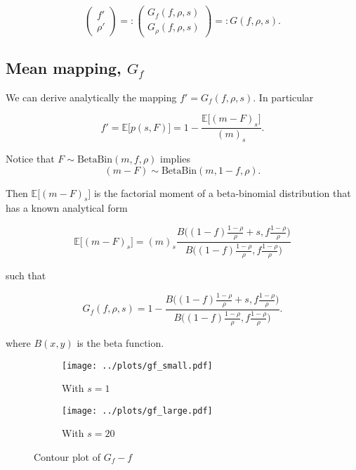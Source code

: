 \documentclass[american, abstract=on]{scrartcl}
\theoremstyle{plain}
\newcommand{\E}{\mathbb{E}}
\newcommand{\Beta}{\text{Beta}}
\newcommand{\Bin}{\text{Bin}}
\begin{document}
\begin{equation}
    \begin{pmatrix}
        f' \\ \rho'
    \end{pmatrix} =: \begin{pmatrix}
        G_f(f, \rho, s) \\ G_\rho(f, \rho, s)
    \end{pmatrix} =: G(f, \rho, s).
\end{equation}

\subsection[Mean mapping]{Mean mapping, $G_f$}

We can derive analytically the mapping $f' = G_f(f, \rho, s)$. In particular

\begin{equation}
    f' = \E\big[p(s, F)\big] = 1 - \frac{\E\big[(m - F)_s\big]}{(m)_s}.
\end{equation}

Notice that $F \sim \Beta\Bin(m, f, \rho)$ implies \begin{equation}(m - F) \sim \Beta\Bin(m, 1 - f, \rho).\end{equation}

Then $\E\big[(m - F)_s\big]$ is the factorial moment of a beta-binomial distribution that has a known analytical form

\begin{equation}
    \E\big[(m - F)_s\big] = (m)_s \frac{B\Big( (1 - f) \frac{1 - \rho}{\rho} + s, f \frac{1 - \rho}{\rho} \Big)}{B\Big( (1 - f) \frac{1 - \rho}{\rho}, f \frac{1 - \rho}{\rho} \Big)}
\end{equation}

such that

\begin{equation}
    G_f(f, \rho, s) = 1 - \frac{B\Big( (1 - f) \frac{1 - \rho}{\rho} + s, f \frac{1 - \rho}{\rho} \Big)}{B\Big( (1 - f) \frac{1 - \rho}{\rho}, f \frac{1 - \rho}{\rho} \Big)}.
\end{equation}

where $B(x, y)$ is the beta function.

\begin{figure}[H]
    \centering
    \begin{subfigure}{.5\textwidth}
      \centering
      \texttt{[image: ../plots/gf\_small.pdf]} 
      \caption{With $s = 1$}
      \label{fig:gf:small}  
    \end{subfigure}%
    \begin{subfigure}{.5\textwidth}
      \centering
      \texttt{[image: ../plots/gf\_large.pdf]}       
      \caption{With $s = 20$}
      \label{fig:gf:large}
    \end{subfigure}
    \caption{Contour plot of $G_f - f$}
    \label{fig:gf}
  \end{figure}
\end{document}
